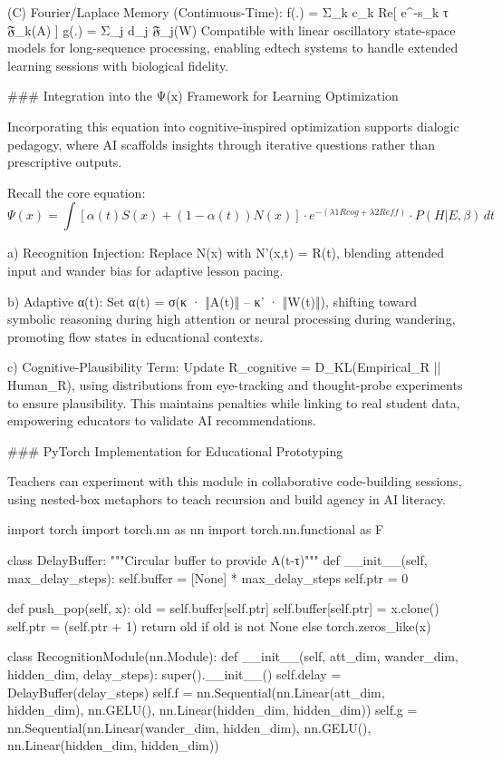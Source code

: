 (C) Fourier/Laplace Memory (Continuous-Time):
f(.) = Σ_k c_k Re[ e^{-s_k τ} 𝔉_k(A) ]
g(.) = Σ_j d_j 𝔉_j(W)
Compatible with linear oscillatory state-space models for long-sequence processing, enabling edtech systems to handle extended learning sessions with biological fidelity.

### Integration into the Ψ(x) Framework for Learning Optimization

Incorporating this equation into cognitive-inspired optimization supports dialogic pedagogy, where AI scaffolds insights through iterative questions rather than prescriptive outputs.

Recall the core equation:
$$ \Psi(x) = \int [\alpha(t) S(x) + (1 - \alpha(t)) N(x)] \cdot e^{-(\lambda1 R{cog} + \lambda2 R{eff})} \cdot P(H|E, \beta) \, dt $$

a) Recognition Injection:
Replace N(x) with N'(x,t) = R(t), blending attended input and wander bias for adaptive lesson pacing.

b) Adaptive α(t):
Set α(t) = σ(κ · ‖A(t)‖ – κ' · ‖W(t)‖), shifting toward symbolic reasoning during high attention or neural processing during wandering, promoting flow states in educational contexts.

c) Cognitive-Plausibility Term:
Update R_cognitive = D_KL(Empirical_R || Human_R), using distributions from eye-tracking and thought-probe experiments to ensure plausibility.
This maintains penalties while linking to real student data, empowering educators to validate AI recommendations.

### PyTorch Implementation for Educational Prototyping

Teachers can experiment with this module in collaborative code-building sessions, using nested-box metaphors to teach recursion and build agency in AI literacy.

import torch
import torch.nn as nn
import torch.nn.functional as F

class DelayBuffer:
    """Circular buffer to provide A(t-τ)"""
    def __init__(self, max_delay_steps):
        self.buffer = [None] * max_delay_steps
        self.ptr = 0

    def push_pop(self, x):
        old = self.buffer[self.ptr]
        self.buffer[self.ptr] = x.clone()
        self.ptr = (self.ptr + 1) %
        return old if old is not None else torch.zeros_like(x)

class RecognitionModule(nn.Module):
    def __init__(self, att_dim, wander_dim, hidden_dim, delay_steps):
        super().__init__()
        self.delay = DelayBuffer(delay_steps)
        self.f = nn.Sequential(nn.Linear(att_dim, hidden_dim),
                               nn.GELU(),
                               nn.Linear(hidden_dim, hidden_dim))
        self.g = nn.Sequential(nn.Linear(wander_dim, hidden_dim),
                               nn.GELU(),
                               nn.Linear(hidden_dim, hidden_dim))

